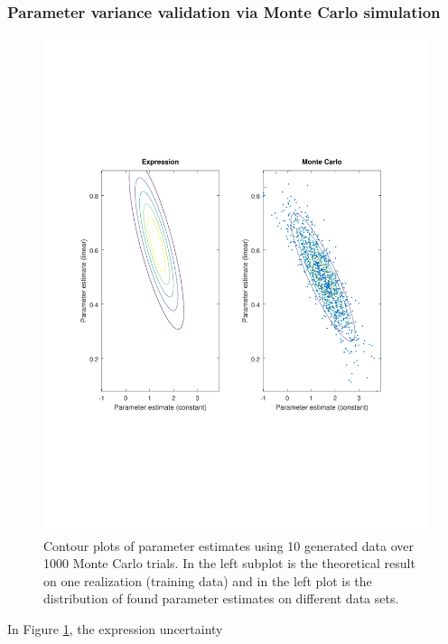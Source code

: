 \documentclass[]{article}
\begin{document}
\subsubsection{Parameter variance validation via Monte Carlo simulation}
\begin{figure}[H]
	\centering
	\includegraphics[trim= 10cm 5cm 10cm 5cm, scale=0.4]{proj1-3_1c}
	\caption{Contour plots of parameter estimates using 10 generated data over 1000 Monte Carlo trials. In the left subplot is the theoretical result on one realization (training data) and in the left plot is the distribution of found parameter estimates on different data sets.}
	\label{fig:MC}
\end{figure}
In Figure \ref{fig:MC}, the expression uncertainty 
\end{document}
